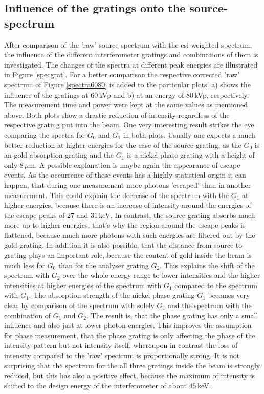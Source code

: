 \subsection{Influence of the gratings onto the source-spectrum}\label{subsec:gratspec}
After comparison of the 'raw' source spectrum with the \gls{csi} weighted spectrum, the influence of the different interferometer gratings and combinations of them is investigated. The changes of the spectra at different peak energies are illustrated in Figure \ref{specgrat}. For a better comparison the respective corrected 'raw' spectrum of Figure \ref{spectra6080} is added to the particular plots. a) shows the influence of the gratings at $60\,$kVp and b) at an energy of $80\,$kVp, respectively. The measurement time and power were kept at the same values as mentioned above. Both plots show a drastic reduction of intensity regardless of the respective grating put into the beam. One very interesting result strikes the eye comparing the spectra for $G_{0}$ and $G_{1}$ in both plots. Usually one expects a much better reduction at higher energies for the case of the source grating, as the $G_{0}$ is an gold absorption grating and the $G_{1}$ is a nickel phase grating with a height of only $8\, \mu$m. A possible explanation is maybe again the appearance of escape events. As the occurrence of these events has a highly statistical origin it can happen, that during one measurement more photons 'escaped' than in another measurement. This could explain the decrease of the spectrum with the $G_{1}$ at higher energies, because there is an increase of intensity around the energies of the escape peaks of $27$ and $31\,$keV. In contrast, the source grating absorbs much more up to higher energies, that's why the region around the escape peaks is flattened, because much more photons with such energies are filtered out by the gold-grating. In addition it is also possible, that the distance from source to grating plays an important role, because the content of gold inside the beam is much less for $G_{0}$ than for the analyser grating $G_{2}$. This explains the shift of the spectrum  with $G_{2}$ over the whole energy range to lower intensities and the higher intensities at higher energies of the spectrum with $G_{1}$ compared to the spectrum with $G_{1}$. The absorption strength of the nickel phase grating $G_{1}$ becomes very clear by comparison of the spectrum with solely $G_{1}$ and the spectrum with the combination of $G_{1}$ and $G_{2}$. The result is, that the phase grating has only a small influence and also just at lower photon energies. This improves the assumption for phase measurement, that the phase grating is only affecting the phase of the intensity-pattern but not intensity itself, whereupon in contrast the loss of intensity compared to the 'raw' spectrum is proportionally strong. It is not surprising that the spectrum for the all three gratings inside the beam is strongly reduced, but this has also a positive effect, because the maximum of intensity is shifted to the design energy of the interferometer of about $45\,$keV. 
